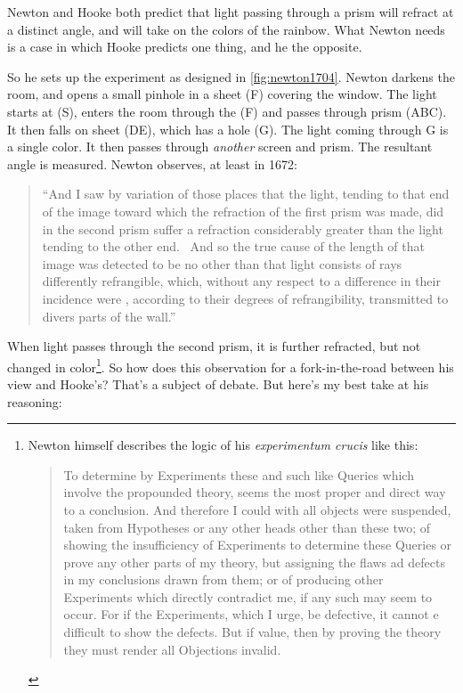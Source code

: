 \begin{refsection}
Newton and Hooke both predict that light passing through a prism will refract at a distinct angle, and will take on the colors of the rainbow. What Newton needs is a case in which Hooke predicts one thing, and he the opposite. 

So he sets up the experiment as designed in \ref{fig:newton1704}. Newton darkens the room, and opens a small pinhole in a sheet (F) covering the window. The light starts at (S), enters the room through the (F) and passes through prism (ABC). It then falls on sheet (DE), which has a hole (G). The light coming through G is a single color. It then passes through \emph{another} screen and prism. The resultant angle is measured. Newton observes, at least in 1672:

\begin{quote}

``And I saw by variation of those places that the light, tending to that end of the image toward which the refraction of the first prism was made, did in the second prism suffer a refraction considerably greater than the light tending to the other end.  And so the true cause of the length of that image was detected to be no other than that light consists of rays differently refrangible, which, without any respect to a difference in their incidence were , according to their degrees of refrangibility, transmitted to divers parts of the wall.''
\end{quote}

When light passes through the second prism, it is further refracted, but not changed in color\footnote{Newton himself describes the logic of his \emph{experimentum crucis} like this:

\begin{quote}

To determine by Experiments these and such like Queries which involve the propounded theory, seems the most proper and direct way to a conclusion. And therefore I could with all objects were suspended, taken from Hypotheses or any other heads other than these two; of showing the insufficiency of Experiments to determine these Queries or prove any other parts of my theory, but assigning the flaws ad defects in my conclusions drawn from them; or of producing other Experiments which directly contradict me, if any such may seem to occur. For if the Experiments, which I urge, be defective, it cannot e difficult to show the defects. But if value, then by proving the theory they must render all Objections invalid. ~\citep[p. 5005]{Newton:1672tm}
\end{quote}}. So how does this observation for a fork-in-the-road between his view and Hooke's? That's a subject of debate. But here's my best take at his reasoning:


\end{refsection}
